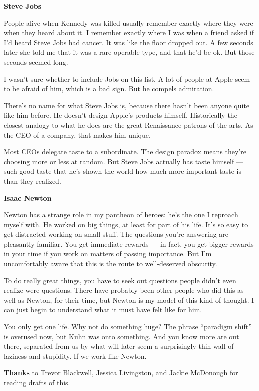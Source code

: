 \documentclass[12pt]{book}
\begin{document}
\textbf{Steve Jobs}

People alive when Kennedy was killed usually remember exactly where they
were when they heard about it. I remember exactly where I was when a
friend asked if I'd heard Steve Jobs had cancer. It was like the floor
dropped out. A few seconds later she told me that it was a rare operable
type, and that he'd be ok. But those seconds seemed long.

I wasn't sure whether to include Jobs on this list. A lot of people at
Apple seem to be afraid of him, which is a bad sign. But he compels
admiration.

There's no name for what Steve Jobs is, because there hasn't been anyone
quite like him before. He doesn't design Apple's products himself.
Historically the closest analogy to what he does are the great
Renaissance patrons of the arts. As the CEO of a company, that makes him
unique.

Most CEOs delegate \href{taste.html}{taste} to a subordinate. The
\href{gh.html}{design paradox} means they're choosing more or less at
random. But Steve Jobs actually has taste himself --- such good taste
that he's shown the world how much more important taste is than they
realized.

\textbf{Isaac Newton}

Newton has a strange role in my pantheon of heroes: he's the one I
reproach myself with. He worked on big things, at least for part of his
life. It's so easy to get distracted working on small stuff. The
questions you're answering are pleasantly familiar. You get immediate
rewards --- in fact, you get bigger rewards in your time if you work on
matters of passing importance. But I'm uncomfortably aware that this is
the route to well-deserved obscurity.

To do really great things, you have to seek out questions people didn't
even realize were questions. There have probably been other people who
did this as well as Newton, for their time, but Newton is my model of
this kind of thought. I can just begin to understand what it must have
felt like for him.

You only get one life. Why not do something huge? The phrase ``paradigm
shift'' is overused now, but Kuhn was onto something. And you know more
are out there, separated from us by what will later seem a surprisingly
thin wall of laziness and stupidity. If we work like Newton.

\textbf{Thanks} to Trevor Blackwell, Jessica Livingston, and Jackie
McDonough for reading drafts of this.
\end{document}
